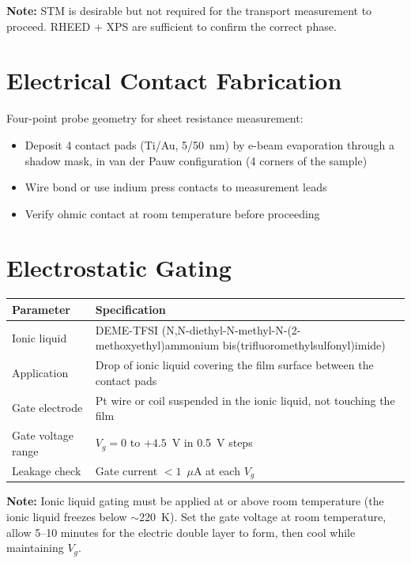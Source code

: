 \documentclass[11pt, a4paper]{article}
\begin{document}
\textbf{Note:} STM is desirable but not required for the
transport measurement to proceed. RHEED + XPS are sufficient
to confirm the correct phase.

\section{Electrical Contact Fabrication}

Four-point probe geometry for sheet resistance measurement:

\begin{itemize}[nosep]
  \item Deposit 4 contact pads (Ti/Au, 5/50~nm) by e-beam
        evaporation through a shadow mask, in van der Pauw
        configuration (4 corners of the sample)
  \item Wire bond or use indium press contacts to measurement
        leads
  \item Verify ohmic contact at room temperature before
        proceeding
\end{itemize}

\section{Electrostatic Gating}

\begin{center}
\begin{tabular}{@{}lp{9cm}@{}}
\toprule
\textbf{Parameter} & \textbf{Specification} \\
\midrule
Ionic liquid & DEME-TFSI
  (N,N-diethyl-N-methyl-N-(2-methoxyethyl)ammonium
  bis(trifluoromethylsulfonyl)imide) \\
Application & Drop of ionic liquid covering the film surface
  between the contact pads \\
Gate electrode & Pt wire or coil suspended in the ionic liquid,
  not touching the film \\
Gate voltage range & $V_g = 0$ to $+4.5$~V in 0.5~V steps \\
Leakage check & Gate current $< 1$~$\mu$A at each $V_g$ \\
\bottomrule
\end{tabular}
\end{center}

\textbf{Note:} Ionic liquid gating must be applied at or above
room temperature (the ionic liquid freezes below $\sim 220$~K).
Set the gate voltage at room temperature, allow 5--10 minutes
for the electric double layer to form, then cool while
maintaining $V_g$.
\end{document}
